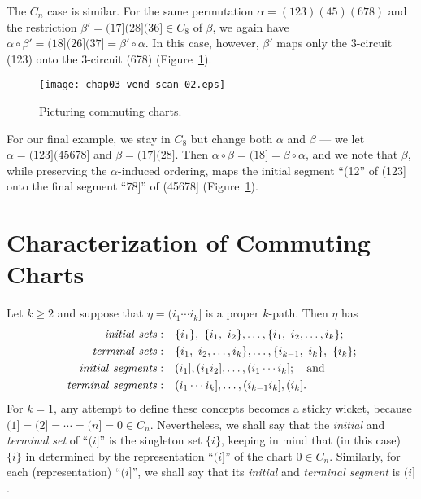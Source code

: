 \documentclass{surv-l}
\numberwithin{equation}{section}
\numberwithin{table}{section}
\numberwithin{figure}{section}
\theoremstyle{plain}
\theoremstyle{definition}
\begin{document}
The $C_{n}$ case is similar. For the same permutation
$\alpha=(123)(45)(678)$ and the restriction
$\beta'=(17](28](36]\in C_{8}$ of $\beta$, we again have
$\alpha\circ\beta'=(18](26](37]=\beta'\circ \alpha$. In this case,
however, $\beta'$ maps only the 3-circuit (123) onto the 3-circuit
(678) (Figure~\ref{fig3.9.2}).

\begin{figure}[!h]
\texttt{[image: chap03-vend-scan-02.eps]}
\caption{Picturing commuting charts.}\label{fig3.9.2}
\end{figure}

For our final example, we stay in $C_{8}$ but change both $\alpha$
and $\beta$ --- we let $\alpha=(123](45678]$ and $\beta=(17](28]$.
Then $\alpha \circ\beta=(18]=\beta \circ\alpha$, and we note that
$\beta$, while preserving the $\alpha$-induced ordering, maps the
initial segment ``(12'' of (123] onto the final segment ``78]'' of
(45678] (Figure~\ref{fig3.9.2}).

\section{Characterization of Commuting Charts}\label{sec3.10}

Let $k\geq 2$ and suppose that $\eta=(i_{1}\cdots i_{k}]$ is a
proper $k$-path. Then $\eta$ has
\begin{align*}
\mathit{initial\ sets}:\index{initial sets of}\quad &\{i_{1}\},\ \{i_{1},\ i_{2}\},\ldots,
\{i_{1},\ i_{2},\ldots, i_{k}\}; \\
\mathit{terminal\ sets}:\quad &\{i_{1},\ i_{2},\ldots, i_{k}\},\ldots, \{i_{k-1},\ i_{k}\},\ \{i_{k}\}; \\
\mathit{initial\ segments}:\quad &(i_{1}], (i_{1}i_{2}],\ldots,(i_{1}\cdots i_{k}];\quad \mathrm{and} \\
\mathit{terminal\ segments}:\quad &(i_{1}\cdots i_{k}],\ldots,(i_{k-1}i_{k}],(i_{k}].
\end{align*}
For $k=1$, any attempt to define these concepts becomes a sticky
wicket, because $(1]=(2]=\cdots=(n]=0\in C_{n}$. Nevertheless, we
shall say that the \emph{initial} and
\emph{terminal set} of ``$(i]$'' is the
singleton set $\{i\}$, keeping in mind that (in this case) $\{i\}$
in determined by the representation ``$(i]$'' of the chart $0\in
C_{n}$. Similarly, for each (representation) ``$(i]$'', we shall
say that its \emph{initial} and \emph{terminal
segment} is $(i]$.
\end{document}
